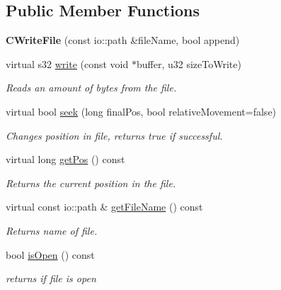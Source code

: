 \subsection*{Public Member Functions}
\begin{DoxyCompactItemize}
\item 
\hypertarget{classirr_1_1io_1_1_c_write_file_ae06a6e0a2b56b5f38f17895794a929d3}{{\bfseries C\-Write\-File} (const io\-::path \&file\-Name, bool append)}\label{classirr_1_1io_1_1_c_write_file_ae06a6e0a2b56b5f38f17895794a929d3}

\item 
virtual s32 \hyperlink{classirr_1_1io_1_1_c_write_file_acc23d39409fa952330123ecf03ef4752}{write} (const void $\ast$buffer, u32 size\-To\-Write)
\begin{DoxyCompactList}\small\item\em Reads an amount of bytes from the file. \end{DoxyCompactList}\item 
virtual bool \hyperlink{classirr_1_1io_1_1_c_write_file_a53f3c5370d3c15bfa51c0bdb1675ac11}{seek} (long final\-Pos, bool relative\-Movement=false)
\begin{DoxyCompactList}\small\item\em Changes position in file, returns true if successful. \end{DoxyCompactList}\item 
virtual long \hyperlink{classirr_1_1io_1_1_c_write_file_a02a85f61b46ad875a8b9816dff8c0094}{get\-Pos} () const 
\begin{DoxyCompactList}\small\item\em Returns the current position in the file. \end{DoxyCompactList}\item 
virtual const io\-::path \& \hyperlink{classirr_1_1io_1_1_c_write_file_a2d9b6b6ca506c7b642480cbb5f1a96f3}{get\-File\-Name} () const 
\begin{DoxyCompactList}\small\item\em Returns name of file. \end{DoxyCompactList}\item 
\hypertarget{classirr_1_1io_1_1_c_write_file_a5f1b063f41cab5c984a27579f348221a}{bool \hyperlink{classirr_1_1io_1_1_c_write_file_a5f1b063f41cab5c984a27579f348221a}{is\-Open} () const }\label{classirr_1_1io_1_1_c_write_file_a5f1b063f41cab5c984a27579f348221a}

\begin{DoxyCompactList}\small\item\em returns if file is open \end{DoxyCompactList}\end{DoxyCompactItemize}


